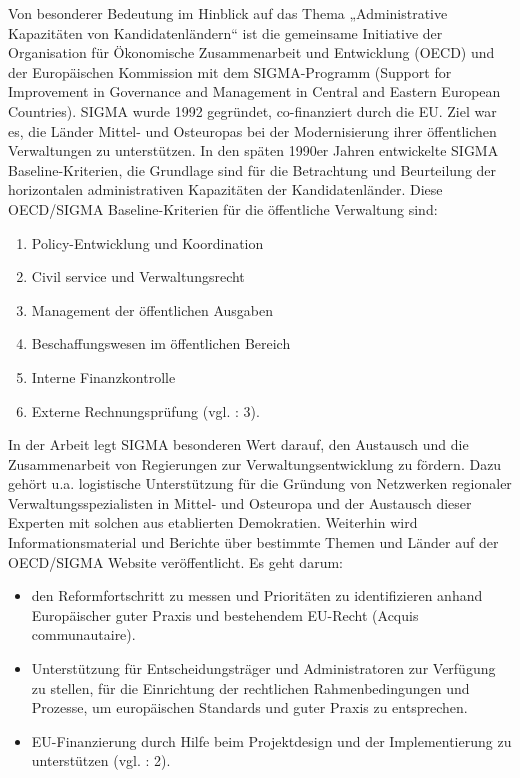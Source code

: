 Von besonderer Bedeutung im Hinblick auf das Thema „Administrative Kapazitäten von Kandidatenländern“ ist die gemeinsame Initiative der Organisation für Ökonomische Zusammenarbeit und Entwicklung (OECD) und der Europäischen Kommission mit dem SIGMA-Programm (Support for Improvement in Governance and Management in Central and Eastern European Countries). SIGMA wurde 1992 gegründet, co-finanziert durch die EU. Ziel war es, die Länder Mittel- und Osteuropas bei der Modernisierung ihrer öffentlichen Verwaltungen zu unterstützen. In den späten 1990er Jahren entwickelte SIGMA Baseline-Kriterien, die Grundlage sind für die Betrachtung und Beurteilung der horizontalen administrativen Kapazitäten der Kandidatenländer. Diese OECD/SIGMA Baseline-Kriterien für die öffentliche Verwaltung sind: 
\begin{enumerate} \itemsep1pt \parskip0pt 
\item Policy-Entwicklung und Koordination 
\item Civil service und Verwaltungsrecht
\item Management der öffentlichen Ausgaben
\item Beschaffungswesen im öffentlichen Bereich
\item Interne Finanzkontrolle
\item Externe Rechnungsprüfung (vgl. \cite{cardona09} : 3).
\end{enumerate}
In der Arbeit legt SIGMA besonderen Wert darauf, den Austausch und die Zusammenarbeit von Regierungen zur Verwaltungsentwicklung zu fördern. Dazu gehört u.a. logistische Unterstützung für die Gründung von Netzwerken regionaler Verwaltungsspezialisten in Mittel- und Osteuropa und der Austausch dieser Experten mit solchen aus etablierten Demokratien. Weiterhin wird Informationsmaterial und Berichte über bestimmte Themen und Länder auf der OECD/SIGMA Website veröffentlicht. Es geht darum:
\begin{itemize} \itemsep1pt \parskip0pt 
\item den Reformfortschritt zu messen und Prioritäten zu identifizieren anhand Europäischer guter Praxis und bestehendem EU-Recht (Acquis communautaire). 
\item Unterstützung für Entscheidungsträger und Administratoren zur Verfügung zu stellen, für die Einrichtung der rechtlichen Rahmenbedingungen und Prozesse, um europäischen Standards und guter Praxis zu entsprechen.
\item EU-Finanzierung durch Hilfe beim Projektdesign und der Implementierung zu unterstützen (vgl. \cite{oecd99} : 2).
\end{itemize}
